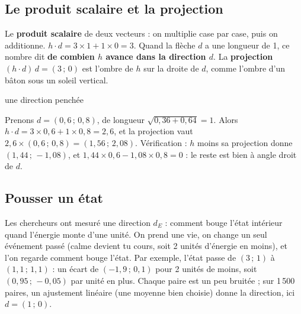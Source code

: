 \documentclass[fontsize=10pt,paper=a4,parskip=half-]{scrartcl}
\newcommand{\q}[1]{\og #1\fg{}}
\newcommand{\vect}[2]{(#1\,;\,#2)}
\begin{document}
\subsection{Le produit scalaire et la projection}
Le \textbf{produit scalaire} de deux vecteurs : on multiplie case par case, puis on
additionne. $h \cdot d = 3\times 1 + 1 \times 0 = 3$. Quand la flèche $d$ a une longueur
de 1, ce nombre dit \textbf{de combien $h$ avance dans la direction $d$}. La
\textbf{projection} $(h\cdot d)\, d = \vect{3}{0}$ est \q{l'ombre} de $h$ sur la droite
de $d$, comme l'ombre d'un bâton sous un soleil vertical.

\begin{calcul}{une direction penchée}
\begin{minipage}{0.6\linewidth}
\raggedright
Prenons $d = \vect{0,6}{0,8}$, de longueur $\sqrt{0,36+0,64} = 1$.
Alors $h\cdot d = 3\times 0,6 + 1\times 0,8 = 2,6$, et la projection vaut
$2,6 \times \vect{0,6}{0,8} = \vect{1,56}{2,08}$.
Vérification : $h$ moins sa projection donne $\vect{1,44}{-1,08}$, et
$1,44\times 0,6 - 1,08\times 0,8 = 0$ : le reste est bien à angle droit de $d$.
\end{minipage}\hfill
\begin{minipage}{0.34\linewidth}
\centering
{}
\end{minipage}
\end{calcul}

\subsection{Pousser un état}
\label{sec:pousser}
Les chercheurs ont mesuré une direction $d_E$ : \q{comment bouge l'état intérieur quand
l'énergie monte d'une unité}. On prend une vie, on change un seul événement passé
(\q{calme} devient \q{tu cours}, soit 2 unités d'énergie en moins), et l'on regarde
comment bouge l'état. Par exemple, l'état passe de $\vect{3}{1}$ à $\vect{1,1}{1,1}$ :
un écart de $\vect{-1,9}{0,1}$ pour 2 unités de moins, soit $\vect{0,95}{-0,05}$ par unité
en plus. Chaque paire est un peu bruitée ; sur 1\,500 paires, un ajustement linéaire
(une moyenne bien choisie) donne la direction, ici $d = \vect{1}{0}$.
\end{document}
